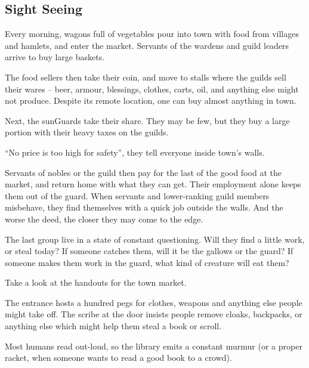 \begin{multicols}{2}

\subsection{Sight Seeing}


Every morning, wagons full of vegetables pour into \gls{town} with food from \glspl{village} and hamlets, and enter the market.
Servants of the \glspl{warden} and guild leaders arrive to buy large baskets.

The food sellers then take their coin, and move to stalls where the guilds sell their wares -- beer, armour, blessings, clothes, carts, oil, and anything else  might not produce.
Despite its remote location, one can buy almost anything in \gls{town}.

Next, the \glspl{sunGuard} take their share.
They may be few, but they buy a large portion with their heavy taxes on the guilds.

``No price is too high for safety'', they tell everyone inside \gls{town}'s walls.

Servants of nobles or the guild then pay for the last of the good food at the market, and return home with what they can get.
Their employment alone keeps them out of the \gls{guard}.
When servants and lower-ranking guild members misbehave, they find themselves with a quick job outside the walls.
And the worse the deed, the closer they may come to the \gls{edge}.

The last group live in a state of constant questioning.
Will they find a little work, or steal today?
If someone catches them, will it be the gallows or the guard?
If someone makes them work in the \gls{guard}, what kind of creature will eat them?

Take a look at the handouts for the \gls{town} market.


The entrance hosts a hundred pegs for clothes, weapons and anything else people might take off.
The \gls{scribe} at the door insists people remove cloaks, backpacks, or anything else which might help them steal a book or scroll.

Most humans read out-loud, so the library emits a constant murmur (or a proper racket, when someone wants to read a good book to a crowd).


\end{multicols}

